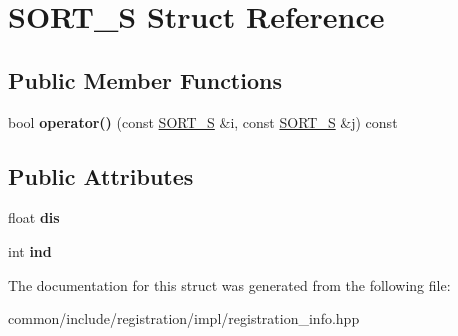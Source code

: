 \hypertarget{structSORT__S}{
\section{SORT\_\-S Struct Reference}
\label{structSORT__S}
}
\subsection*{Public Member Functions}
\begin{DoxyCompactItemize}
\item 
\hypertarget{structSORT__S_a8347d01556e36ec1eba673aa5be5f92e}{
bool {\bfseries operator()} (const \hyperlink{structSORT__S}{SORT\_\-S} \&i, const \hyperlink{structSORT__S}{SORT\_\-S} \&j) const }
\label{structSORT__S_a8347d01556e36ec1eba673aa5be5f92e}

\end{DoxyCompactItemize}
\subsection*{Public Attributes}
\begin{DoxyCompactItemize}
\item 
\hypertarget{structSORT__S_ae7f94164d10c83193571f39091fca282}{
float {\bfseries dis}}
\label{structSORT__S_ae7f94164d10c83193571f39091fca282}

\item 
\hypertarget{structSORT__S_a85f1c6e0ef6b14c057f104fcb48f2fa9}{
int {\bfseries ind}}
\label{structSORT__S_a85f1c6e0ef6b14c057f104fcb48f2fa9}

\end{DoxyCompactItemize}


The documentation for this struct was generated from the following file:\begin{DoxyCompactItemize}
\item 
common/include/registration/impl/registration\_\-info.hpp\end{DoxyCompactItemize}
